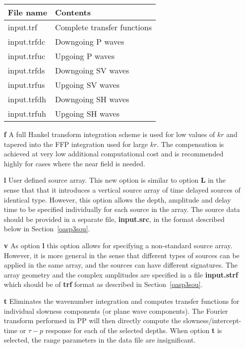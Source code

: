 \begin{itemize}
          \begin{tabular}{ll}
          File name & Contents \\ \hline
          input.trf &     Complete transfer functions \\
          input.trfdc &    Downgoing P waves \\
          input.trfuc  &  Upgoing P waves  \\
          input.trfds  &  Downgoing  SV waves  \\
          input.trfus &    Upgoing SV waves \\
          input.trfdh  &  Downgoing  SH waves  \\
          input.trfuh &    Upgoing SH waves 
          \end{tabular}
    \item[{\bf f}] A full Hankel transform integration scheme is used
for low values of $ kr $ and tapered into the FFP integration used for
large $ kr $. The compensation is achieved at very low additional computational
cost and is recommended highly for cases where the near field is
needed.    
    \item[{\bf l}] User defined source array. This new option is
similar to option {\bf L} in the sense that that it introduces a
vertical source array of time delayed sources of identical type. However,
this option allows the depth, amplitude and  delay time to be
specified individually for each source in the array. The source data
should be provided in a separate file, {\bf input.src}, in the format
described below in Section~\ref{oasp3sou}.  
    \item[{\bf v}] As option {\bf l} this option allows for specifying
a non-standard source array. However, it is more general in the sense
that different types of sources can be applied in the same array, and
the sources can have different signatures. The array geometry and the
complex amplitudes are specified in a file {\bf input.strf} which
should be of {\bf trf} format as described in Section~\ref{oasp3sou}. 
    \item[{\bf t}] Eliminates the wavenumber integration and computes
       transfer functions for individual slowness components (or plane wave
       components). The Fourier transform performed in PP will then
directly compute the slowness/intercept-time or $\tau - p$ response
for each of the selected depths. When option {\bf t} is selected, the
range parameters in the data file are insignificant.     
\end{itemize}


